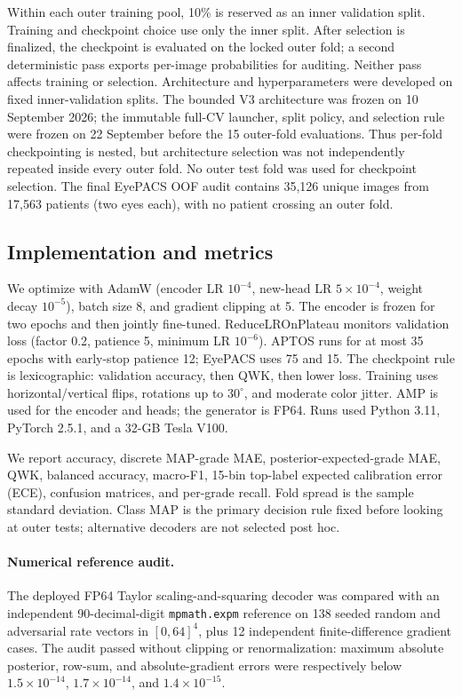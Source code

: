 \documentclass[10pt,twocolumn,letterpaper]{article}
\begin{document}
Within each outer training pool, 10\% is reserved as an inner validation split.
Training and checkpoint choice use only the inner split.  After selection is
finalized, the checkpoint is evaluated on the locked outer fold; a second
deterministic pass exports per-image probabilities for auditing.  Neither pass
affects training or selection.  Architecture and hyperparameters were developed
on fixed inner-validation splits.  The bounded V3 architecture was frozen on
10 September 2026; the immutable full-CV launcher, split policy, and selection
rule were frozen on 22 September before the 15 outer-fold evaluations.  Thus per-fold
checkpointing is nested, but architecture selection was not independently
repeated inside every outer fold.  No outer test fold was used for checkpoint
selection.  The final EyePACS OOF audit contains 35,126 unique images from
17,563 patients (two eyes each), with no patient crossing an outer fold.

\subsection{Implementation and metrics}

We optimize with AdamW (encoder LR $10^{-4}$, new-head LR $5\times10^{-4}$,
weight decay $10^{-5}$), batch size 8, and gradient clipping at 5.  The encoder
is frozen for two epochs and then jointly fine-tuned.  ReduceLROnPlateau monitors
validation loss (factor 0.2, patience 5, minimum LR $10^{-6}$).  APTOS runs for
at most 35 epochs with early-stop patience 12; EyePACS uses 75 and 15.  The
checkpoint rule is lexicographic: validation accuracy, then QWK, then lower
loss.  Training uses horizontal/vertical flips, rotations up to $30^\circ$, and
moderate color jitter.  AMP is used for the encoder and heads; the generator is
FP64.  Runs used Python 3.11, PyTorch 2.5.1, and a 32-GB Tesla V100.

We report accuracy, discrete MAP-grade MAE, posterior-expected-grade MAE, QWK,
balanced accuracy, macro-F1, 15-bin top-label expected calibration error (ECE),
confusion matrices, and per-grade recall.  Fold spread is the sample standard
deviation.  Class MAP is the primary decision rule fixed before looking at
outer tests; alternative decoders are not selected post hoc.

\paragraph{Numerical reference audit.}
The deployed FP64 Taylor scaling-and-squaring decoder was compared with an
independent 90-decimal-digit \texttt{mpmath.expm} reference on 138 seeded random
and adversarial rate vectors in $[0,64]^4$, plus 12 independent
finite-difference gradient cases.  The audit passed without clipping or
renormalization: maximum absolute posterior, row-sum, and absolute-gradient
errors were respectively below $1.5\times10^{-14}$,
$1.7\times10^{-14}$, and $1.4\times10^{-15}$.
\end{document}
